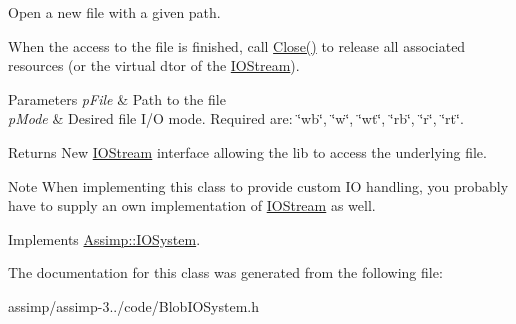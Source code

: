 Open a new file with a given path. 

When the access to the file is finished, call \hyperlink{class_assimp_1_1_blob_i_o_system_a626f7f153b4f5ac39adf38b6a539bedb}{Close()} to release all associated resources (or the virtual dtor of the \hyperlink{class_assimp_1_1_i_o_stream}{I\+O\+Stream}).


\begin{DoxyParams}{Parameters}
{\em p\+File} & Path to the file \\
\hline
{\em p\+Mode} & Desired file I/\+O mode. Required are\+: \char`\"{}wb\char`\"{}, \char`\"{}w\char`\"{}, \char`\"{}wt\char`\"{}, \char`\"{}rb\char`\"{}, \char`\"{}r\char`\"{}, \char`\"{}rt\char`\"{}.\\
\hline
\end{DoxyParams}
\begin{DoxyReturn}{Returns}
New \hyperlink{class_assimp_1_1_i_o_stream}{I\+O\+Stream} interface allowing the lib to access the underlying file. 
\end{DoxyReturn}
\begin{DoxyNote}{Note}
When implementing this class to provide custom I\+O handling, you probably have to supply an own implementation of \hyperlink{class_assimp_1_1_i_o_stream}{I\+O\+Stream} as well. 
\end{DoxyNote}


Implements \hyperlink{class_assimp_1_1_i_o_system_ac512ece3b0701de5682553007a4c0816}{Assimp\+::\+I\+O\+System}.



The documentation for this class was generated from the following file\+:\begin{DoxyCompactItemize}
\item 
assimp/assimp-\/3../code/Blob\+I\+O\+System.\+h\end{DoxyCompactItemize}
